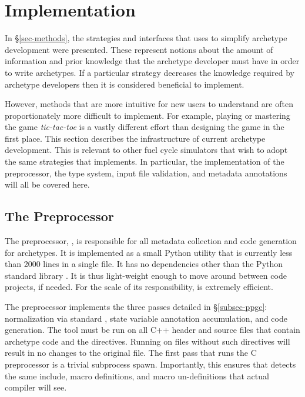 \section{Implementation}
\label{sec-impl}

In \S \ref{sec-methods}, the strategies and interfaces that \Cyclus uses to 
simplify archetype development were presented. These represent notions about
the amount of information and prior knowledge that the archetype developer 
must have in order to write archetypes.  If a particular strategy 
decreases the knowledge required by archetype developers then it is considered
beneficial to implement.  

However, methods that are more intuitive for new users to understand are often
proportionately more difficult to implement. For example, playing or mastering 
the game \emph{tic-tac-toe} is a vastly different effort than
designing the game in the first place.  
This section describes the infrastructure of
current \cyclus archetype development.  This is relevant to other fuel 
cycle simulators that wish to adopt the same strategies that \cyclus 
implements. In particular, the implementation of the \cyclus preprocessor, 
the type system, input file validation, and metadata annotations will all 
be covered here.

\subsection{The \Cyclus Preprocessor}

The \cyclus preprocessor, \cycpp, is responsible for all metadata collection and 
code generation for archetypes. It is implemented as a small Python utility 
that is currently less than 2000 lines in a single file.  It has no dependencies other 
than the Python standard library \cite{lutz2010programming}. It is thus light-weight enough to move around 
between code projects, if needed. For the scale of its responsibility, \cycpp
is extremely efficient. 

The preprocessor implements the three passes detailed in \S\ref{subsec-ppgc}:
normalization via standard , state variable annotation accumulation, and code 
generation. The \cycpp tool must be run on all C++ header and source files that
contain archetype code and the  directives. Running \cycpp
on files without such directives will result in no changes to the 
original file. The first \cycpp
pass that runs the C preprocessor is a trivial subprocess 
spawn. Importantly, this ensures that \cycpp detects the
same include, macro definitions, and macro un-definitions that actual 
compiler will see.

